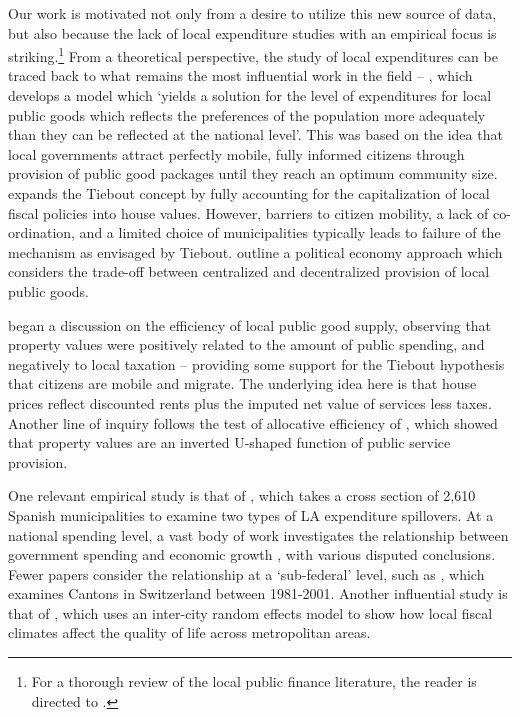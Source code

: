 \documentclass[12pt]{article}
\begin{document}
Our work is motivated not only from a desire to utilize this new source of data, but also because the lack of local expenditure studies with an empirical focus is striking.\footnote{For a thorough review of the local public finance literature, the reader is directed to \cite{Blankart2005}.} From a theoretical perspective, the study of local expenditures can be traced back to what remains the most influential work in the field -- \cite{tiebout1956}, which develops a model which `yields a solution for the level of expenditures for local public goods which reflects the preferences of the population more adequately than they can be reflected at the national level'. This was based on the idea that local governments attract perfectly mobile, fully informed citizens through provision of public good packages until they reach an optimum community size. \cite{yinger1982} expands the Tiebout concept by fully accounting for the capitalization of local fiscal policies into house values. However, barriers to citizen mobility, a lack of co-ordination, and a limited choice of municipalities typically leads to failure of the mechanism as envisaged by Tiebout. \cite{Besley20032611} outline a political economy approach which considers the trade-off between centralized and decentralized provision of local public goods.

\cite{Oats1969} began a discussion on the efficiency of local public good supply, observing that property values were positively related to the amount of public spending, and negatively to local taxation -- providing some support for the Tiebout hypothesis that citizens are mobile and migrate. The underlying idea here is that house prices reflect discounted rents plus the imputed net value of services less taxes. Another line of inquiry follows the test of allocative efficiency of \cite{Brueckner1982}, which showed that property values are an inverted U-shaped function of public service provision.

One relevant empirical study is that of \cite{SoleOlle2006}, which takes a cross section of 2,610 Spanish municipalities to examine two types of LA expenditure spillovers. At a national spending level, a vast body of work investigates the relationship between government spending and economic growth \citep[such as][]{Barro1991}, with various disputed conclusions. Fewer papers consider the relationship at a `sub-federal' level, such as \cite{Schaltegger2004}, which examines Cantons in Switzerland between 1981-2001. Another influential study is that of \cite{Gyourko1991}, which uses an inter-city random effects model to show how local fiscal climates affect the quality of life across metropolitan areas.
\end{document}
